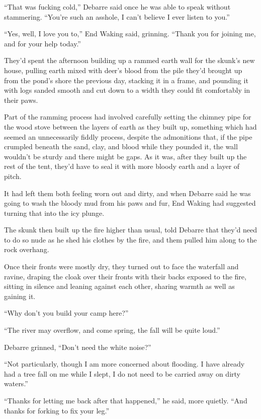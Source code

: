 ``That was fucking cold,'' Debarre said once he was able to speak without stammering. ``You're such an asshole, I can't believe I ever listen to you.''

``Yes, well, I love you to,'' End Waking said, grinning. ``Thank you for joining me, and for your help today.''

They'd spent the afternoon building up a rammed earth wall for the skunk's new house, pulling earth mixed with deer's blood from the pile they'd brought up from the pond's shore the previous day, stacking it in a frame, and pounding it with logs sanded smooth and cut down to a width they could fit comfortably in their paws.

Part of the ramming process had involved carefully setting the chimney pipe for the wood stove between the layers of earth as they built up, something which had seemed an unnecessarily fiddly process, despite the admonitions that, if the pipe crumpled beneath the sand, clay, and blood while they pounded it, the wall wouldn't be sturdy and there might be gaps. As it was, after they built up the rest of the tent, they'd have to seal it with more bloody earth and a layer of pitch.

It had left them both feeling worn out and dirty, and when Debarre said he was going to wash the bloody mud from his paws and fur, End Waking had suggested turning that into the icy plunge.

The skunk then built up the fire higher than usual, told Debarre that they'd need to do so nude as he shed his clothes by the fire, and them pulled him along to the rock overhang.

Once their fronts were mostly dry, they turned out to face the waterfall and ravine, draping the cloak over their fronts with their backs exposed to the fire, sitting in silence and leaning against each other, sharing warmth as well as gaining it.

``Why don't you build your camp here?''

``The river may overflow, and come spring, the fall will be quite loud.''

Debarre grinned, ``Don't need the white noise?''

``Not particularly, though I am more concerned about flooding. I have already had a tree fall on me while I slept, I do not need to be carried away on dirty waters.''

``Thanks for letting me back after that happened,'' he said, more quietly. ``And thanks for forking to fix your leg.''

